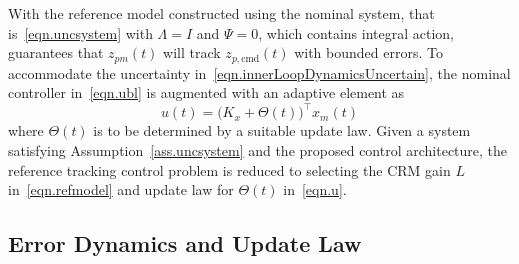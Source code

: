 \documentclass[journal]{IEEEtran}
\theoremstyle{innercustomthm}
\begin{document}
  With the reference model constructed using the nominal system, that is\ \eqref{eqn.uncsystem} with $\Lambda=I$ and $\Psi=0$, which contains integral action, guarantees that $z_{pm}(t)$ will track $z_{p,\text{cmd}}(t)$ with bounded errors.
  To accommodate the uncertainty in\ \eqref{eqn.innerLoopDynamicsUncertain}, the nominal controller in\ \eqref{eqn.ubl} is augmented with an adaptive element as
  \begin{equation}
    \label{eqn.u}
    u(t) = \bigr(K_{x}+\Theta(t)\bigr)^{\top}x_{m}(t)
  \end{equation}
  where $\Theta(t)$ is to be determined by a suitable update law.
  Given a system satisfying Assumption~\ref{ass.uncsystem} and the proposed control architecture, the reference tracking control problem is reduced to selecting the CRM gain $L$ in\ \eqref{eqn.refmodel} and update law for $\Theta(t)$ in\ \eqref{eqn.u}.

  \subsection{Error Dynamics and Update Law}
\end{document}
